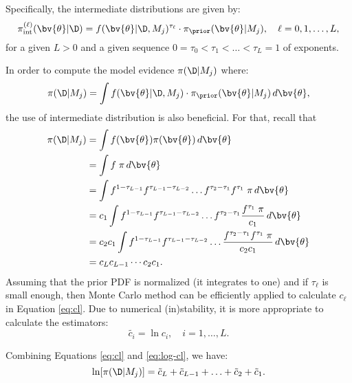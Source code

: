 Specifically, the
intermediate distributions are given by:
\begin{equation}
\label{eq:intermediate_dist}
\pi_\text{int}^{(\ell)} (\bv{\theta}|\D) = f(\bv{\theta}|\D, M_j)^{\tau_\ell} \cdot \pi_\prior (\bv{\theta} | M_j), \quad \ell=0,1,\ldots,L,
\end{equation}
for a given $L > 0$ and a given sequence $0 = \tau_0 < \tau_1 < \ldots < \tau_L = 1$ of exponents.


 

In order to compute the model evidence $\pi( \D |M_j)$ where:
\begin{equation}
 \label{eq:evidence}
 \pi( \D |M_j)=\int f(\bv{\theta}|\D, M_j) \cdot \pi_\prior (\bv{\theta}|M_j) \, d\bv{\theta}, 
\end{equation}
the use of intermediate distribution is also beneficial.
For that, recall that
\begin{equation}
\label{eq:cl}
\begin{split}
 \pi( \D |M_j) &= \int f(\bv{\theta})\pi (\bv{\theta}) \, d\bv{\theta} \\
  &= \int f \; \pi \, d\bv{\theta} \\
  &= \int f^{1-\tau_{L-1}} f^{\tau_{L-1}-\tau_{L-2}}\ldots f^{\tau_2-\tau_1} f^{\tau_1}\; \pi \, d\bv{\theta} \\
  &= c_1 \int f^{1-\tau_{L-1}} f^{\tau_{L-1}-\tau_{L-2}}\ldots f^{\tau_2-\tau_1} \dfrac{f^{\tau_1}\; \pi}{c_1} \, d\bv{\theta} \\
  &= c_2 c_1 \int f^{1-\tau_{L-1}} f^{\tau_{L-1}-\tau_{L-2}}\ldots  \dfrac{f^{\tau_2-\tau_1} f^{\tau_1}\; \pi}{c_2 c_1} \, d\bv{\theta} \\
  &= c_L c_{L-1} \cdots c_2 c_1.
\end{split}
\end{equation}
Assuming that the prior PDF is normalized (it integrates to one) and if $\tau_{\ell}$ is small enough, then Monte Carlo method can be efficiently applied to calculate $c_{\ell}$ in Equation \eqref{eq:cl}. Due to numerical (in)stability, it is more appropriate to calculate the estimators:
\begin{equation}
 \label{eq:log-cl}
 \tilde{c_i} = \ln c_i, \quad i=1,\ldots, L.
\end{equation}

Combining Equations \eqref{eq:cl} and \eqref{eq:log-cl}, we have:
\begin{equation*}
 \ln[\pi( \D |M_j)] = \tilde{c}_{L}+\tilde{c}_{L-1}+\ldots+\tilde{c}_2+\tilde{c}_1.
\end{equation*}



